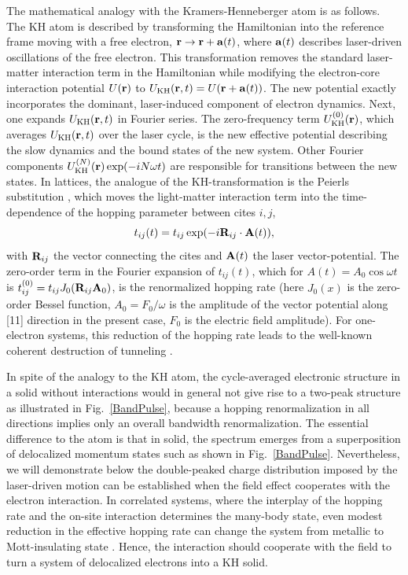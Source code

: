 The mathematical analogy with the Kramers-Henneberger atom is 
as follows. The KH atom is described by transforming the 
Hamiltonian into the reference frame moving with a free electron,
${\bf r}\rightarrow{\bf r}+{\bf a}(t)$, where ${\bf a}(t)$ describes
laser-driven oscillations of the free electron.
This transformation removes the standard laser-matter interaction 
term in the Hamiltonian while modifying the electron-core interaction potential $U(\bf r)$ to
$U_{\rm KH}({\bf r},t)=U({\bf r}+{\bf a}(t))$.
The new potential exactly incorporates the dominant, laser-induced component of electron dynamics. Next, one expands 
$U_{\rm KH}({\bf r},t)$ in Fourier series.
The zero-frequency term $U^{(0)}_{\rm KH}({\bf r})$, 
which averages $U_{\rm KH}({\bf r},t)$ over the laser cycle, 
is the new effective potential describing the slow
dynamics and the 
bound states of the new system. Other 
Fourier components $U^{(N)}_{\rm KH}({\bf r})\exp(-iN\omega t)$ are responsible
for transitions between the new states. 
In lattices, the analogue of the KH-transformation is 
the Peierls substitution \cite{Peierls1933}, which moves 
the light-matter interaction term into the time-dependence of the 
hopping parameter between cites $i,j$,
\begin{equation}
t_{ij}(t)=t_{ij}\exp(-i{\bf R}_{ij}\cdot {\bf A}(t)),
\end{equation}
with ${\bf R}_{ij}$ the vector connecting the cites and ${\bf A}(t)$
the laser vector-potential. The zero-order term 
in the Fourier expansion of $t_{ij}(t)$, which for
$A(t)=A_0\cos\omega t$ is $t^{(0)}_{ij}
=t_{ij}J_0({\bf R}_{ij} {\bf A}_0)$, is the renormalized hopping rate
(here $J_0(x)$ is the zero-order Bessel function, 
$A_0=F_0/\omega$ is the amplitude of the vector potential along [11] direction in the present case, 
$F_0$ is the electric field amplitude). 
For one-electron systems, this reduction of the hopping rate leads to the well-known coherent destruction of tunneling \cite{Dunlap1986}. 

In spite of the analogy to the KH atom, the cycle-averaged electronic structure in a solid without interactions would in general not give rise to a two-peak structure as illustrated in Fig.~\ref{BandPulse}, because a hopping renormalization in all directions implies only an overall bandwidth renormalization. The essential difference to the atom is that in solid, the spectrum emerges from a superposition of delocalized momentum states such as shown in Fig.~\ref{BandPulse}. Nevertheless, we will demonstrate below the double-peaked charge distribution imposed by the laser-driven motion can be established when the field effect cooperates with the electron interaction. In correlated systems, where the interplay of the hopping rate and the on-site interaction determines the many-body state, even modest reduction in the effective hopping rate can change the system from metallic to Mott-insulating state \cite{RevModPhys.86.779}. Hence, the interaction should cooperate with the field to turn a system of delocalized electrons into a KH solid.


